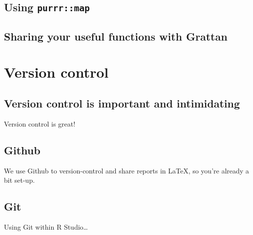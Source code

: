 \documentclass[]{book}
\begin{document}
\hypertarget{using-purrrmap}{%
\section{\texorpdfstring{Using \texttt{purrr::map}}{Using purrr::map}}\label{using-purrrmap}}

\hypertarget{sharing-your-useful-functions-with-grattan}{%
\section{Sharing your useful functions with Grattan}\label{sharing-your-useful-functions-with-grattan}}

\hypertarget{version-control}{%
\chapter{Version control}\label{version-control}}

\hypertarget{version-control-is-important-and-intimidating}{%
\section{Version control is important and intimidating}\label{version-control-is-important-and-intimidating}}

Version control is great!

\hypertarget{github}{%
\section{Github}\label{github}}

We use Github to version-control and share reports in LaTeX, so you're already a bit set-up.

\hypertarget{git}{%
\section{Git}\label{git}}

Using Git within R Studio\ldots{}


\end{document}
